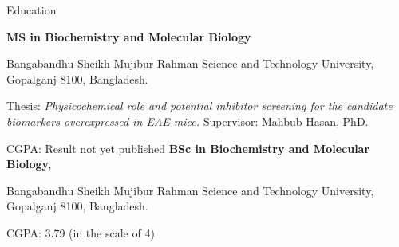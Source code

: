 \begin{rubric}{Education}

\entry*[2020 - 2021]%
	\textbf{MS in Biochemistry and Molecular Biology}\par 
	Bangabandhu Sheikh Mujibur Rahman Science and Technology University, Gopalganj 8100, Bangladesh.\par
	Thesis: \emph{Physicochemical role and potential inhibitor screening for the candidate biomarkers overexpressed in EAE mice.} Supervisor: Mahbub Hasan, PhD. \par
	CGPA: Result not yet published
%
\entry*[2016 - 2019]%
	\textbf{BSc in Biochemistry and Molecular Biology, }\par
	Bangabandhu Sheikh Mujibur Rahman Science and Technology University, Gopalganj 8100, Bangladesh.\par
	CGPA: 3.79 (in the scale of 4)
\end{rubric}